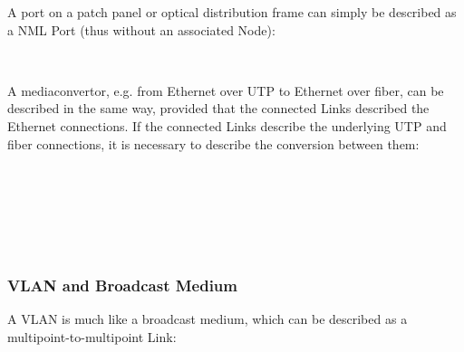 A port on a patch panel or optical distribution frame can simply be described as a NML Port (thus without an associated Node):

\\

A mediaconvertor, e.g. from Ethernet over UTP to Ethernet over fiber, can be described in the same way, provided that the connected Links described the Ethernet connections. If the connected Links describe the underlying UTP and fiber connections, it is necessary to describe the conversion between them:

 \\
 \\
 \\
 \\
 \\


\subsubsection{VLAN and Broadcast Medium}

A VLAN is much like a broadcast medium, which can be described as a multipoint-to-multipoint Link:

 \\
 \\
 \\
 \\
 \\
 \\

